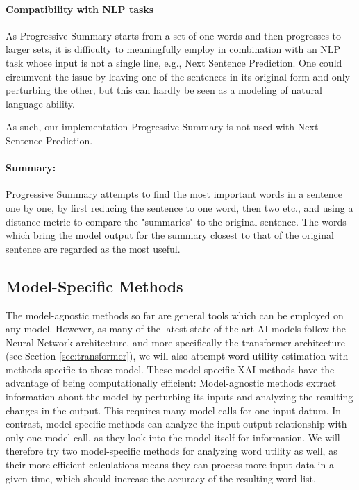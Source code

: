 \paragraph{Compatibility with NLP tasks}
As Progressive Summary starts from a set of one words and then progresses to larger sets, it is difficulty to meaningfully employ in combination with an NLP task whose input is not a single line, e.g., Next Sentence Prediction.
One could circumvent the issue by leaving one of the sentences in its original form and only perturbing the other, but this can hardly be seen as a modeling of natural language ability.


As such, our implementation Progressive Summary is not used with Next Sentence Prediction.

\paragraph{Summary:}
Progressive Summary attempts to find the most important words in a sentence one by one, by first reducing the sentence to one word, then two etc., and using a distance metric to compare the "summaries" to the original sentence.
The words which bring the model output for the summary closest to that of the original sentence are regarded as the most useful.

\subsection{Model-Specific Methods}
The model-agnostic methods so far are general tools which can be employed on any model.
However, as many of the latest state-of-the-art AI models follow the Neural Network architecture, and more specifically the transformer architecture (see Section \ref{sec:transformer}), we will also attempt word utility estimation with methods specific to these model.
These model-specific XAI methods have the advantage of being computationally efficient:
Model-agnostic methods extract information about the model by perturbing its inputs and analyzing the resulting changes in the output.
This requires many model calls for one input datum.
In contrast, model-specific methods can analyze the input-output relationship with only one model call, as they look into the model itself for information.
We will therefore try two model-specific methods for analyzing word utility as well, as their more efficient calculations means they can process more input data in a given time, which should increase the accuracy of the resulting word list.

